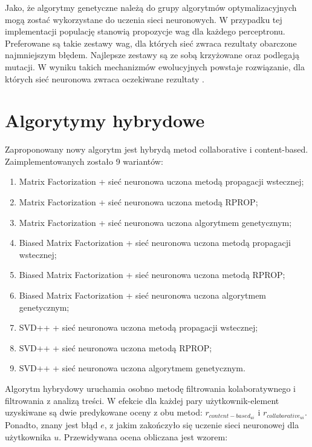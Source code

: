 \documentclass[twoside]{iisthesis}
\begin{document}
		 Jako, że algorytmy genetyczne należą do grupy algorytmów optymalizacyjnych mogą zostać wykorzystane do uczenia sieci neuronowych. W przypadku tej implementacji populację stanowią propozycje wag dla każdego perceptronu. Preferowane są takie zestawy wag, dla których sieć zwraca rezultaty obarczone najmniejszym błędem. Najlepsze zestawy są ze sobą krzyżowane oraz podlegają mutacji. W wyniku takich mechanizmów ewolucyjnych powstaje rozwiązanie, dla których sieć neuronowa zwraca oczekiwane rezultaty \cite{aforgenetgenetic}\cite{montana1989training}.
		 
		 
	 \section{Algorytymy hybrydowe}
		 
		 Zaproponowany nowy algorytm jest hybrydą metod collaborative i content-based. Zaimplementowanych zostało 9 wariantów:
		 
		 \begin{enumerate}
		 	\item Matrix Factorization + sieć neuronowa uczona metodą propagacji wstecznej;
		 	\item Matrix Factorization + sieć neuronowa uczona metodą RPROP;
		 	\item Matrix Factorization + sieć neuronowa uczona algorytmem genetycznym;
		 	\item Biased Matrix Factorization + sieć neuronowa uczona metodą propagacji wstecznej;
		 	\item Biased Matrix Factorization + sieć neuronowa uczona metodą RPROP;
		 	\item Biased Matrix Factorization + sieć neuronowa uczona algorytmem genetycznym;		 	
		 	\item SVD++ + sieć neuronowa uczona metodą propagacji wstecznej;
		 	\item SVD++ + sieć neuronowa uczona metodą RPROP;
		 	\item SVD++ + sieć neuronowa uczona algorytmem genetycznym.
		 \end{enumerate}
		 
		 Algorytm hybrydowy uruchamia osobno metodę filtrowania kolaboratywnego i filtrowania z analizą treści. W efekcie dla każdej pary użytkownik-element uzyskiwane są dwie  predykowane oceny z obu metod:  $r_{content-based_{ui}}$ i $r_{collaborative_{ui}}$. Ponadto, znany jest błąd $e$, z jakim zakończyło się uczenie sieci neuronowej dla użytkownika $u$. Przewidywana ocena obliczana jest wzorem:
		 
\end{document}
